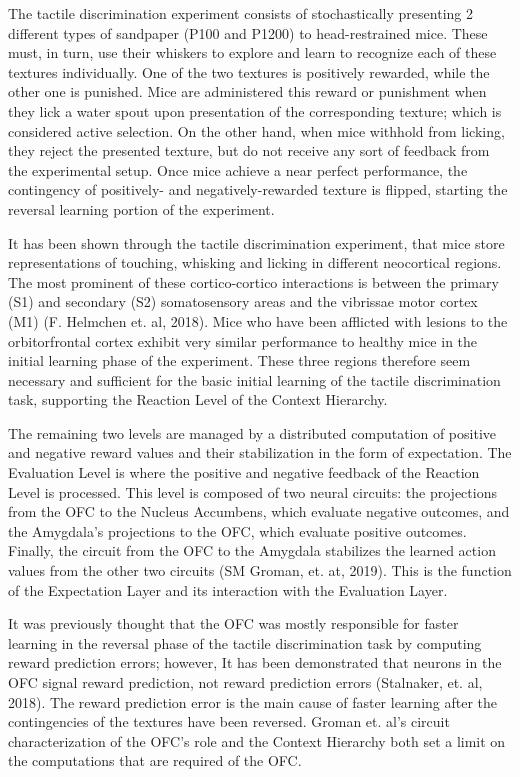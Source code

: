 \documentclass[]{article}
\begin{document}
The tactile discrimination experiment consists of stochastically presenting 2 different types of sandpaper (P100 and P1200) to head-restrained mice.  These must, in turn, use their whiskers to explore and learn to recognize each of these textures individually.  One of the two textures is positively rewarded, while the other one is punished.  Mice are administered this reward or punishment when they lick a water spout upon presentation of the corresponding texture; which is considered active selection.  On the other hand, when mice withhold from licking, they reject the presented texture, but do not receive any sort of feedback from the experimental setup.  Once mice achieve a near perfect performance, the contingency of positively- and negatively-rewarded texture is flipped, starting the reversal learning portion of the experiment.

It has been shown through the tactile discrimination experiment, that mice store representations of touching, whisking and licking in different neocortical regions.  The most prominent of these cortico-cortico interactions is between the primary (S1) and secondary (S2) somatosensory areas and the vibrissae motor cortex (M1) (F. Helmchen et. al, 2018).  Mice who have been afflicted with lesions to the orbitorfrontal cortex exhibit very similar performance to healthy mice in the initial learning phase of the experiment.  These three regions therefore seem necessary and sufficient for the basic initial learning of the tactile discrimination task, supporting the Reaction Level of the Context Hierarchy.

The remaining two levels are managed by a distributed computation of positive and negative reward values and their stabilization in the form of expectation.  The Evaluation Level is where the positive and negative feedback of the Reaction Level is processed.  This level is composed of two neural circuits: the projections from the OFC to the Nucleus Accumbens, which evaluate negative outcomes, and the Amygdala's projections to the OFC, which evaluate positive outcomes.  Finally, the circuit from the OFC to the Amygdala stabilizes the learned action values from the other two circuits (SM Groman, et. at, 2019).  This is the function of the Expectation Layer and its interaction with the Evaluation Layer.

It was previously thought that the OFC was mostly responsible for faster learning in the reversal phase of the tactile discrimination task by computing reward prediction errors; however, It has been demonstrated that neurons in the OFC signal reward prediction, not reward prediction errors (Stalnaker, et. al, 2018).  The reward prediction error is the main cause of faster learning after the contingencies of the textures have been reversed.  Groman et. al's circuit characterization of the OFC's role and the Context Hierarchy both set a limit on the computations that are required of the OFC.
\end{document}
